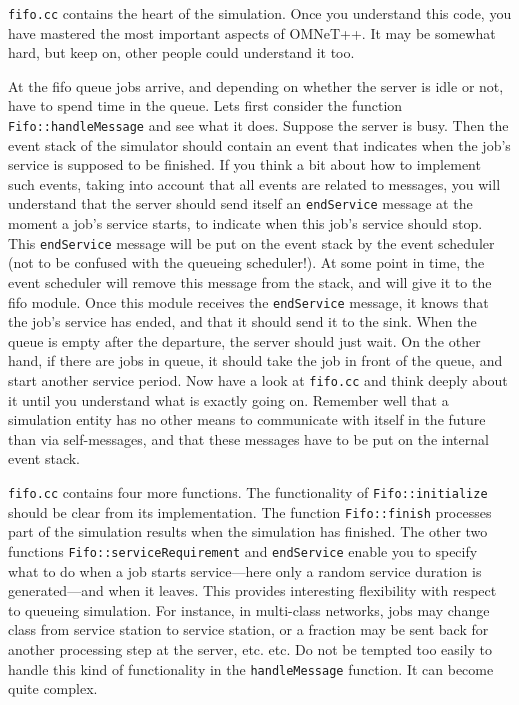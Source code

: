 \documentclass[a4paper]{article}
\begin{document}
\texttt{fifo.cc} contains the heart of the simulation. Once you
understand this code, you have mastered the most important aspects of
OMNeT++. It may be somewhat hard, but keep on, other people could
understand it too.

At the fifo queue jobs arrive, and depending on whether the server is
idle or not, have to spend time in the queue. Lets first consider the
function \texttt{Fifo::handleMessage} and see what it does. Suppose
the server is busy. Then the event stack of the simulator should
contain an event that indicates when the job's service is supposed to
be finished.  If you think a bit about how to implement such events,
taking into account that all events are related to messages, you will
understand that the server should send itself an \texttt{endService}
message at the moment a job's service starts, to indicate when this
job's service should stop.  This \texttt{endService} message will be
put on the event stack by the event scheduler (not to be confused with
the queueing scheduler!). At some point in time, the event scheduler
will remove this message from the stack, and will give it to the fifo
module.  Once this module receives the \texttt{endService} message, it
knows that the job's service has ended, and that it should send it to
the sink. When the queue is empty after the departure, the server
should just wait. On the other hand, if there are jobs in queue, it
should take the job in front of the queue, and start another service
period. Now have a look at \texttt{fifo.cc} and think deeply about it
until you understand what is exactly going on. Remember well that a
simulation entity has no other means to communicate with itself in the
future than via self-messages, and that these messages have to be put
on the internal event stack.

\texttt{fifo.cc} contains four more functions. The functionality of
\texttt{Fifo::initialize} should be clear from its implementation. The
function \texttt{Fifo::finish} processes part of the simulation
results when the simulation has finished.  The other two functions
\texttt{Fifo::serviceRequirement} and \texttt{endService} enable you
to specify what to do when a job starts service---here only a random
service duration is generated---and when it leaves. This provides
interesting flexibility with respect to queueing simulation. For
instance, in multi-class networks, jobs may change class from service
station to service station, or a fraction may be sent back for another
processing step at the server, etc. etc. Do not be tempted too easily
to handle this kind of functionality in the \texttt{handleMessage}
function. It can become quite complex.
\end{document}
